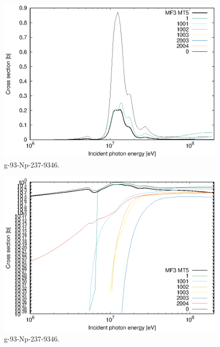 \begin{figure}
 \includegraphics[width=\linewidth]{eps/g_93-Np-237_9346.eps}
  \caption{g-93-Np-237-9346.}
\end{figure}
\begin{figure}
 \includegraphics[width=\linewidth]{eps-log/g_93-Np-237_9346.eps}
 \caption{g-93-Np-237-9346.}
\end{figure}
\newpage \clearpage

